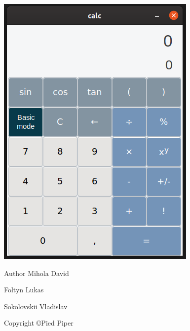 \begin{DoxyImage}
\includegraphics[width=\textwidth,height=\textheight/2,keepaspectratio=true]{screenshot_pro.png}
\end{DoxyImage}
 \begin{DoxyAuthor}{Author}
Mihola David 

Foltyn Lukas 

Sokolovskii Vladislav 
\end{DoxyAuthor}
\begin{DoxyCopyright}{Copyright}
©\+Pied Piper 
\end{DoxyCopyright}

